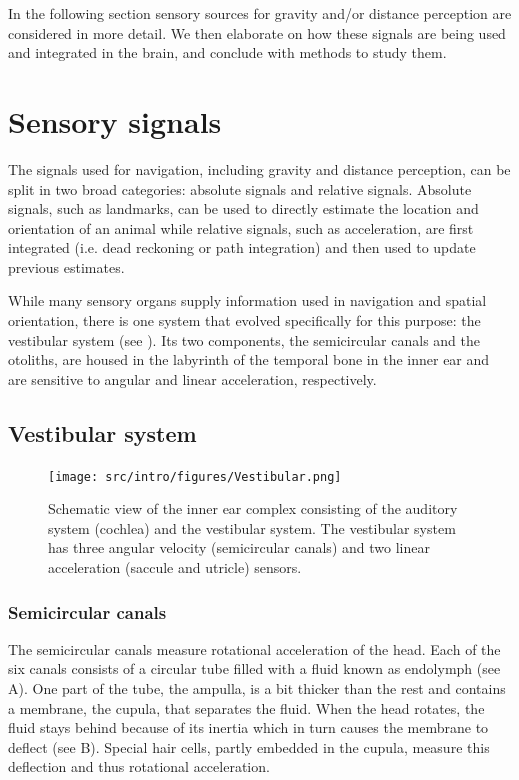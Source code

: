In the following section sensory sources for gravity and/or distance perception are considered in more detail. We then elaborate on how these signals are being used and integrated in the brain, and conclude with methods to study them.

\section{Sensory signals}
The signals used for navigation, including gravity and distance perception, can be split in two broad categories: absolute signals and relative signals.  Absolute signals, such as landmarks, can be used to directly estimate the location and orientation of an animal while relative signals, such as acceleration, are first integrated (i.e. dead reckoning or path integration) and then used to update previous estimates.
	
While many sensory organs supply information used in navigation and spatial orientation, there is one system that evolved specifically for this purpose: the vestibular system (see ). Its two components, the semicircular canals and the otoliths, are housed in the labyrinth of the temporal bone in the inner ear and are sensitive to angular and linear acceleration, respectively.


\subsection{Vestibular system}

\begin{figure}
    \texttt{[image: src/intro/figures/Vestibular.png]}
    \caption{Schematic view of the inner ear complex consisting of the auditory system (cochlea) and the vestibular system. The vestibular system has three angular velocity (semicircular canals) and two linear acceleration (saccule and utricle) sensors.}
    \label{intro:fig6}
\end{figure}


\subsubsection{Semicircular canals}
The semicircular canals measure rotational acceleration  of the head. Each of the six  canals consists of a circular tube filled with a fluid known as endolymph (see A). One part of the tube, the ampulla, is a bit thicker than the rest and contains a membrane, the cupula, that separates the fluid. When the head rotates, the fluid stays behind because of its inertia which in turn causes the membrane to deflect (see B). Special hair cells, partly embedded in the cupula, measure this deflection and thus rotational acceleration.

